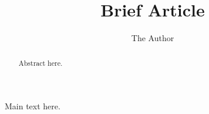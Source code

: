 \documentclass[11pt, oneside]{article}   	%
\title{Brief Article}
\author{The Author}
\date{}
\begin{document}
\maketitle


\begin{abstract}
Abstract here.
\end{abstract}

Main text here.
\end{document}
